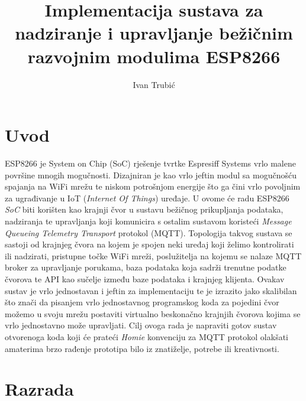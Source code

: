 \documentclass[times, utf8, zavrsni]{fer}
\begin{document}

\title{Implementacija sustava za nadziranje i upravljanje bežičnim razvojnim modulima ESP8266}

\author{Ivan Trubić}

\maketitle

\izvornik

\zahvala{}

\tableofcontents

\chapter{Uvod}
ESP8266 je System on Chip (SoC) rješenje tvrtke Espresiff Systems vrlo malene površine mnogih mogučnosti.
Dizajniran je kao vrlo jeftin modul sa mogučnošću spajanja na WiFi mrežu te niskom potrošnjom energije što ga čini vrlo povoljnim za ugrađivanje u IoT (\textit{Internet Of Things}) uređaje.
U ovome će radu ESP8266 \textit{SoC} biti korišten kao krajnji čvor u sustavu bežičnog prikupljanja podataka, nadziranja te upravljanja koji komunicira s ostalim sustavom koristeći \textit{Message Queueing Telemetry Transport} protokol (MQTT).
Topologija takvog sustava se sastoji od krajnjeg čvora na kojem je spojen neki uređaj koji želimo kontrolirati ili nadzirati, pristupne točke WiFi mreži, poslužitelja na kojemu se nalaze MQTT broker za upravljanje porukama, baza podataka koja sadrži trenutne podatke čvorova te API kao sučelje između baze podataka i krajnjeg klijenta.
Ovakav sustav je vrlo jednostavan i jeftin za implementaciju te je izrazito jako skalibilan što znači da pisanjem vrlo jednostavnog programskog koda za pojedini čvor možemo u svoju mrežu postaviti virtualno beskonačno krajnjih čvorova kojima se vrlo jednostavno može upravljati. 
Cilj ovoga rada je napraviti gotov sustav otvorenoga koda koji će prateći \textit{Homie} konvenciju za MQTT protokol olakšati amaterima brzo rađenje prototipa bilo iz znatiželje, potrebe ili kreativnosti.

\chapter{Razrada}
\end{document}
